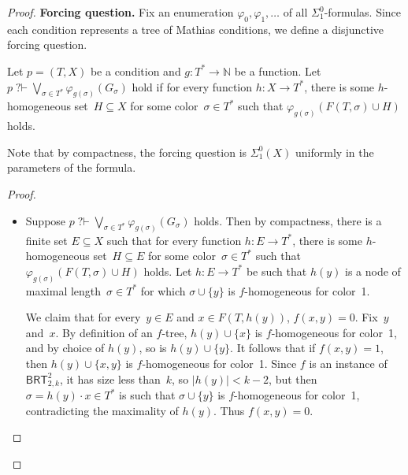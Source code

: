 \documentclass[10pt,a4paper]{amsart}
\newcommand{\BRT}[0]{\mathsf{BRT}}
\newcommand{\NN}[0]{\mathbb{N}}
\newcommand{\nqvdash}{\operatorname{{?}{\nvdash}}}
\newcommand{\qvdash}{\operatorname{{?}{\vdash}}}
\begin{document}
\begin{proof}
\noindent
\textbf{Forcing question.}
Fix an enumeration $\varphi_0, \varphi_1, \dots$ of all $\Sigma^0_1$-formulas.
Since each condition represents a tree of Mathias conditions, we define a disjunctive forcing question.

\begin{definition}
Let $p = (T, X)$ be a condition and $g : T^* \to \NN$ be a function.
Let $p \qvdash \bigvee_{\sigma \in T^*} \varphi_{g(\sigma)}(G_\sigma)$ hold if for every function $h : X \to T^*$,
there is some $h$-homogeneous set~$H \subseteq X$ for some color~$\sigma \in T^*$ such that $\varphi_{g(\sigma)}(F(T, \sigma) \cup H)$ holds.
\end{definition}

Note that by compactness, the forcing question is $\Sigma^0_1(X)$ uniformly in the parameters of the formula.

\begin{proof}\ 
\begin{itemize}
    \item[(i)] Suppose $p \qvdash \bigvee_{\sigma \in T^*} \varphi_{g(\sigma)}(G_\sigma)$ holds. Then by compactness, there is a finite set $E \subseteq X$ such that for every function $h : E \to T^*$, there is some $h$-homogeneous set~$H \subseteq E$ for some color~$\sigma \in T^*$ such that $\varphi_{g(\sigma)}(F(T, \sigma) \cup H)$ holds. 
    Let $h : E \to T^*$ be such that $h(y)$ is a node of maximal length~$\sigma \in T^*$ for which $\sigma \cup \{y\}$ is $f$-homogeneous for color~1. 
    
    We claim that for every~$y \in E$ and $x \in F(T, h(y))$, $f(x, y) = 0$. Fix~$y$ and~$x$. By definition of an $f$-tree, $h(y) \cup \{x\}$ is $f$-homogeneous for color~1, and by choice of $h(y)$, so is $h(y) \cup \{y\}$. It follows that if $f(x, y) = 1$, then $h(y) \cup \{x, y\}$ is $f$-homogeneous for color~1. Since $f$ is an instance of $\BRT^2_{2,k}$, it has size less than~$k$, so $|h(y)| < k-2$, but then $\sigma = h(y) \cdot x \in T^*$ is such that $\sigma \cup \{y\}$ is $f$-homogeneous for color~1, contradicting the maximality of $h(y)$. Thus $f(x, y) = 0$.


\end{itemize}
\end{proof}
\end{proof}
\end{document}
